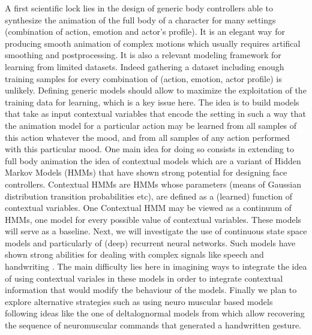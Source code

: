 
A first scientific lock lies in the design of generic body controllers able to synthesize the animation of the full body of a character for many settings (combination of action, emotion and actor's profile). 
It is an elegant way for producing smooth animation of complex motions which usually requires artifical smoothing and postprocessing. It is also a relevant modeling framework for learning from limited datasets. 
Indeed gathering a dataset including enough training samples for every combination of (action, emotion, actor profile) is unlikely. 
Defining generic models should allow to maximize the exploitation of the training data for learning, which is a key issue here. 
The idea is to build models that take as input contextual variables that encode the setting in such a way that the animation model for a particular action may be learned from all samples of this action whatever the mood, and from all samples of any action performed with this particular mood.
One main idea for doing so consists in extending to full body animation the idea of contextual models \cite{Radenen2014, Ding2013, Ding2014} which are a variant of Hidden Markov Models (HMMs) that have shown strong potential for designing face controllers. 
Contextual HMMs are HMMs whose parameters (means of Gaussian distribution transition probabilities etc), are defined as a (learned) function of contextual variables. One Contextual HMM may be viewed as a continuum of HMMs, one model for every possible value of contextual variables.
These models will serve as a baseline. Next, we will investigate the use of continuous state space models and particularly of (deep) recurrent neural networks. Such models have shown strong abilities for dealing with complex signals like speech and handwriting \cite{DBLP:journals/corr/Graves13}. 
The main difficulty lies here in imagining ways to integrate the idea of using contextual variales in these models in order to integrate contextual information that would modify the behaviour of the models. 
Finally we plan to explore alternative strategies such as using neuro muscular based models following ideas like the one of deltalognormal models from \cite{DBLP:conf/icfhr/FischerPOS14,} which allow recovering the sequence of neuromuscular commands that generated a handwritten gesture. 

